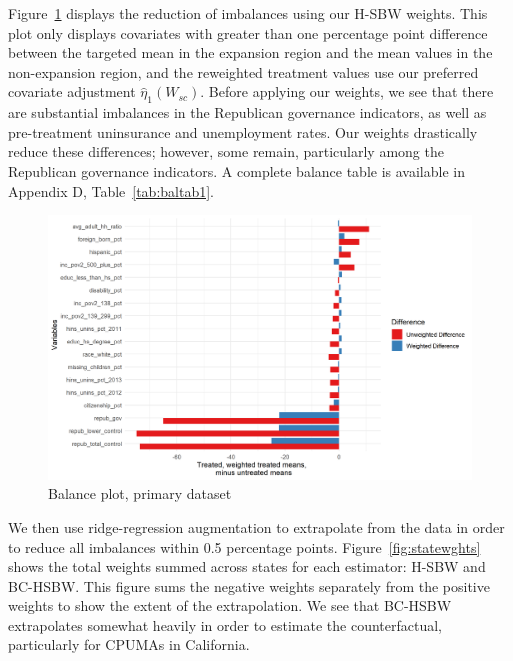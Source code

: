 \documentclass[aoas]{imsart}
\theoremstyle{plain}
\theoremstyle{remark}
\begin{document}
Figure~\ref{fig:loveplotc1} displays the reduction of imbalances using our H-SBW weights. This plot only displays covariates with greater than one percentage point difference between the targeted mean in the expansion region and the mean values in the non-expansion region, and the reweighted treatment values use our preferred covariate adjustment $\hat{\eta}_1(W_{sc})$. Before applying our weights, we see that there are substantial imbalances in the Republican governance indicators, as well as pre-treatment uninsurance and unemployment rates. Our weights drastically reduce these differences; however, some remain, particularly among the Republican governance indicators. A complete balance table is available in Appendix D, Table~\ref{tab:baltab1}. 

\begin{figure}[H]
\begin{center}
    \caption{Balance plot, primary dataset}
    \label{fig:loveplotc1}
    \includegraphics[scale=0.6]{01_Plots/balance-plot-etuc1.png}
\end{center}
\end{figure}

We then use ridge-regression augmentation to extrapolate from the data in order to reduce all imbalances within 0.5 percentage points. Figure~\ref{fig:statewghts} shows the total weights summed across states for each estimator: H-SBW and BC-HSBW. This figure sums the negative weights separately from the positive weights to show the extent of the extrapolation. We see that BC-HSBW extrapolates somewhat heavily in order to estimate the counterfactual, particularly for CPUMAs in California. 
\end{document}
